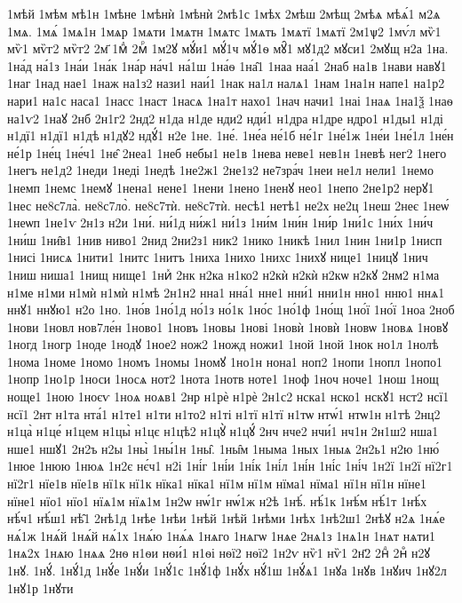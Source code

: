 {1мѣй
1мѣм
мѣ1н
1мѣне
1мѣнѝ
1мѣнѝ
2мѣ1с
1мѣх
2мѣш
2мѣщ
2мѣѧ
мѣѧ́1
м2ѧ
1мѧ.
1мѧ́
1мѧ1н
1мѧр
1мѧти
1мѧтн
1мѧтс
1мѧть
1мѧтї
1мѧтї
2м1ѱ2
1мѵ́л
мѷ1
мѷ1
мѷг2
мѷг2
2м҃
1мⷣ
2мⷬ
1м2ꙋ
мꙋ́и1
мꙋ́1ч
мꙋ́1ѳ
мꙋ̑1
мꙋ1д2
мꙋси1
2мꙋщ
н2а
1на.
1на́д
на́1з
1на́и
1на́к
1на́р
на́ч1
на́1ш
1на́ѳ
1на̑1
1наа
наа́1
2наб
на1в
1нави
навꙋ1
1наг
1над
нае1
1наж
на1з2
нази1
наи́1
1нак
на1л
налѧ1
1нам
1на1н
напе1
на1р2
нари1
на1с
наса1
1насс
1наст
1насѧ
1на1т
нахо1
1нач
начи1
1наі
1наѧ
1на1ѯ
1наѳ
на1ѵ2
1наꙋ
2нб
2н1г2
2нд2
н1да
н1де
нди2
нди́1
н1дра
н1дре
ндро1
н1ды1
н1ді
н1дї1
н1дї1
н1дѣ
н1дꙋ2
ндꙋ́1
н2е
1не.
1не́.
1не́а
не́1б
не́1г
1не́1ж
1не́и
1не́1л
1не́н
не́1р
1не́ц
1не́ч1
1не̑
2неа1
1неб
небы1
не1в
1нева
неве1
нев1н
1невѣ
нег2
1него
1негъ
не1д2
1неди
1неді
1недѣ
1не2ж1
2не1з2
не7зра́ч
1неи
не1л
нели1
1немо
1немп
1немс
1немꙋ
1нена1
нене1
1нени
1нено
1ненꙋ
нео1
1непо
2не1р2
нерꙋ1
1нес
не8с7ла̀.
не8с7ло̀.
не8с7тѝ.
не8с7тѝ.
несѣ1
нетѣ1
не2х
не2ц
1неш
2неє
1неѡ́
1неѡп
1не1ѵ
2н1з
н2и
1ни́.
ни́1д
ни́ж1
ни́1з
1ни́м
1ни́н
1ни́р
1ни́1с
1ни́х
1ни́ч
1ни́ш
1ни̑в1
1нив
ниво1
2нид
2ни2з1
ник2
1нико
1никѣ
1нил
1нин
1ни1р
1нисп
1нисі
1нисѧ
1нити1
1нитс
1нитъ
1ниха
1нихо
1нихс
1нихꙋ
нице1
1ницꙋ
1нич
1ниш
ниша1
1нищ
нище1
1ниⷯ
2нк
н2ка
н1ко2
н2кѝ
н2кѝ
н2кѡ
н2кꙋ
2нм2
н1ма
н1ме
н1ми
н1мѝ
н1мѝ
н1мѣ
2н1н2
нна1
нна́1
нне1
нни́1
нни1н
нно1
нню1
ннѧ1
ннꙋ1
ннꙋю1
н2о
1но.
1но́в
1но́1д
но́1з
но́1к
1но́с
1но́1ф
1но́щ
1но́ї
1но́ї
1ноа
2ноб
1нови
1новл
нов7ле́н
1ново1
1новъ
1новы
1нові
1новѝ
1новѝ
1новѡ
1новѧ
1новꙋ
1ногд
1ногр
1ноде
1нодꙋ
1ное2
нож2
1ножд
ножи1
1ной
1ной
1нок
но1л
1нолѣ
1нома
1номе
1номо
1номъ
1номы
1номꙋ
1но1н
нона1
ноп2
1нопи
1нопл
1нопо1
1нопр
1но1р
1носи
1носѧ
нот2
1нота
1нотв
ноте1
1ноф
1ноч
ноче1
1нош
1нощ
ноще1
1ною
1ноєѵ
1ноѧ
ноѧв1
2нр
н1рѐ
н1рѐ
2н1с2
нска1
нско1
нскꙋ1
нст2
нсї1
нсї1
2нт
н1та
нта́1
н1те1
н1ти
н1то2
н1ті
н1тї
н1тї
н1тѡ
нтѡ́1
нтѡ1н
н1тѣ
2нц2
н1ца̀
н1це́
н1цем
н1цы̀
н1цє
н1цѣ2
н1цꙋ̀
н1цꙋ́
2нч
нче2
нчи́1
нч1н
2н1ш2
нша1
нше1
ншꙋ1
2н2ъ
н2ы
1ны̀
1ны́1н
1ны̑.
1ны̑м
1ныма
1ных
1ныѧ
2н2ь1
н2ю
1ню́
1нюе
1нюю
1нюѧ
1н2є
нє́ч1
н2і
1ні́г
1ні́и
1ні́к
1ні́л
1ні́н
1ні́с
1ні́ч
1н2ї
1н2ї
нї2г1
нї2г1
нїе1в
нїе1в
нї1к
нї1к
нїка1
нїка1
нї1м
нї1м
нїма1
нїма1
нї1н
нї1н
нїне1
нїне1
нїо1
нїо1
нїѧ1м
нїѧ1м
1н2ѡ
нѡ́1г
нѡ́1ж
н2ѣ
1нѣ́.
нѣ́1к
1нѣ́м
нѣ́1т
1нѣ́х
нѣ́ч1
нѣ́ш1
нѣ̑1
2нѣ1д
1нѣе
1нѣи
1нѣй
1нѣй
1нѣми
1нѣх
1нѣ2ш1
2нѣꙋ
н2ѧ
1нѧ́е
нѧ́1ж
1нѧ́й
1нѧ́й
нѧ́1х
1нѧ́ю
1нѧ́ѧ
1нѧго
1нѧгѡ
1нѧе
2нѧ1з
1нѧ1н
1нѧт
нѧти1
1нѧ2х
1нѧю
1нѧѧ
2нѳ
н1ѳи
нѳи́1
н1ѳі
нѳї2
нѳї2
1н2ѵ
нѷ1
нѷ1
2н҃2
2нⷣ
2нⷴ
н2ꙋ
1нꙋ.
1нꙋ́.
1нꙋ́1д
1нꙋ́е
1нꙋ́и
1нꙋ́1с
1нꙋ́1ф
1нꙋ́х
нꙋ́1ш
1нꙋ́ѧ1
1нꙋа
1нꙋв
1нꙋич
1нꙋ2л
1нꙋ1р
1нꙋти
}
